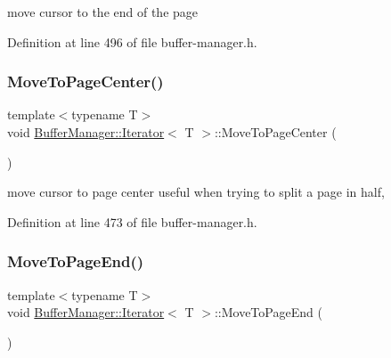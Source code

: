 move cursor to the end of the page 

Definition at line 496 of file buffer-\/manager.\+h.

\mbox{\label{class_buffer_manager_1_1_iterator_a20b703d6135c5e3026eab944a32ca186}} 
\subsubsection{\texorpdfstring{MoveToPageCenter()}{MoveToPageCenter()}}
{\footnotesize\ttfamily template$<$typename T$>$ \\
void \mbox{\hyperlink{class_buffer_manager_1_1_iterator}{Buffer\+Manager\+::\+Iterator}}$<$ T $>$\+::Move\+To\+Page\+Center (\begin{DoxyParamCaption}{ }\end{DoxyParamCaption})\hspace{0.3cm}{\ttfamily [inline]}}

move cursor to page center useful when trying to split a page in half, 
\begin{DoxyCode}{0}
\end{DoxyCode}
 

Definition at line 473 of file buffer-\/manager.\+h.

\mbox{\label{class_buffer_manager_1_1_iterator_a88ae36356076d25c8959ecfbaa084d9f}} 
\subsubsection{\texorpdfstring{MoveToPageEnd()}{MoveToPageEnd()}}
{\footnotesize\ttfamily template$<$typename T$>$ \\
void \mbox{\hyperlink{class_buffer_manager_1_1_iterator}{Buffer\+Manager\+::\+Iterator}}$<$ T $>$\+::Move\+To\+Page\+End (\begin{DoxyParamCaption}{ }\end{DoxyParamCaption})\hspace{0.3cm}{\ttfamily [inline]}}

